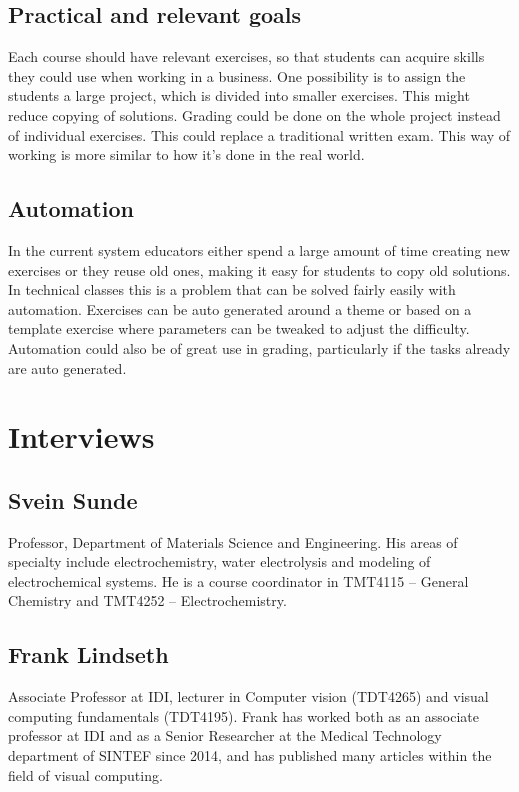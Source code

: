 \documentclass[a4paper]{article}
\begin{document}
\subsection{Practical and relevant goals}
Each course should have relevant exercises, so that students can acquire skills they could use when working in a business. One possibility is to assign the students a large project, which is divided into smaller exercises. This might reduce copying of solutions. Grading could be done on the whole project instead of individual exercises. This could replace a traditional written exam. This way of working is more similar to how it's done in the real world.

\subsection{Automation}
In the current system educators either spend a large amount of time creating new exercises or they reuse old ones, making it easy for students to copy old solutions. In technical classes this is a problem that can be solved fairly easily with automation. Exercises can be auto generated around a theme or based on a template exercise where parameters can be tweaked to adjust the difficulty. Automation could also be of great use in grading, particularly if the tasks already are auto generated.

\section{Interviews}
\subsection{Svein Sunde}
Professor, Department of Materials Science and Engineering. His areas of specialty include electrochemistry, water electrolysis and modeling of electrochemical systems. He is a course coordinator in TMT4115 -- General Chemistry and TMT4252 -- Electrochemistry.

\subsection{Frank Lindseth}
Associate Professor at IDI, lecturer in Computer vision (TDT4265) and visual computing fundamentals (TDT4195). Frank has worked both as an associate professor at IDI and as a Senior Researcher at the Medical Technology department of SINTEF since 2014, and has published many articles within the field of visual computing.
\end{document}
